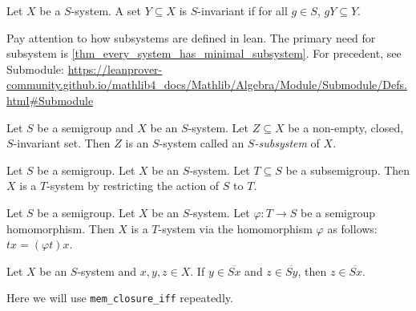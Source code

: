 \begin{definition}
\leanok{}
    Let $X$ be a $S$-system.  A set $Y \subseteq X$ is $S$-invariant if for all $g \in S$, $gY \subseteq Y$.
\end{definition}

\begin{leanrmk}
    Pay attention to how subsystems are defined in lean.  The primary need for subsystem is \cref{thm_every_system_has_minimal_subsystem}.  For precedent, see Submodule: \url{https://leanprover-community.github.io/mathlib4_docs/Mathlib/Algebra/Module/Submodule/Defs.html#Submodule}
\end{leanrmk}

\begin{definition}[Subsystem]
    \label{def_subsystem}
    \leanok{}
    Let $S$ be a semigroup and $X$ be an $S$-system.  Let $Z \subseteq X$ be a non-empty, closed, $S$-invariant set.  Then $Z$ is an $S$-system called an \emph{$S$-subsystem} of $X$.
\end{definition}

\begin{definition}
\label{def_subsemi_system}
    Let $S$ be a semigroup.  Let $X$ be an $S$-system. Let $T \subseteq S$ be a subsemigroup. Then $X$ is a $T$-system by restricting the action of $S$ to $T$.
\end{definition}

\begin{definition}
\label{def_hom_system}
\leanok{}
    Let $S$ be a semigroup.  Let $X$ be an $S$-system.  Let $\varphi: T \to S$ be a semigroup homomorphism.  Then $X$ is a $T$-system via the homomorphism $\varphi$ as follows: $tx = (\varphi t)x$.
\end{definition}

\begin{theorem}
\label{theorem_orbit_closure_transitivity}
\leanok{}
    Let $X$ be an $S$-system and $x,y,z \in X$. If $y \in \overline{Sx}$ and $z \in \overline{Sy}$, then $z \in \overline{Sx}$.
\end{theorem}

\begin{leanrmk}
    Here we will use \verb|mem_closure_iff| repeatedly.
\end{leanrmk}

